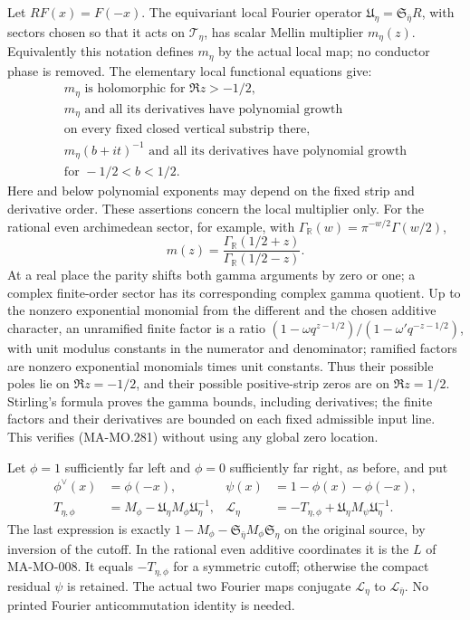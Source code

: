 Let \(R F(x)=F(-x)\). The equivariant local Fourier operator
\(\mathfrak U_\eta=\mathfrak S_{\bar\eta}R\), with sectors
chosen so that it acts on \(\mathcal T_\eta\), has scalar
Mellin multiplier \(m_\eta(z)\). Equivalently this notation
defines \(m_\eta\) by the actual local map; no conductor phase
is removed. The elementary local functional equations give:
\[
 \begin{gathered}
 m_\eta\text{ is holomorphic for }\Re z>-1/2,\\
 m_\eta\text{ and all its derivatives have polynomial growth}\\
 \text{on every fixed closed vertical substrip there},\\
 m_\eta(b+it)^{-1}\text{ and all its derivatives have polynomial growth}\\
 \text{for }-1/2<b<1/2.
 \end{gathered}
 \tag{MA-MO.281}
\]
Here and below polynomial exponents may depend on the fixed
strip and derivative order. These assertions concern the local
multiplier only. For the rational even archimedean sector, for
example, with \(\Gamma_{\mathbb R}(w)=\pi^{-w/2}\Gamma(w/2)\),
\[
       m(z)=\frac{\Gamma_{\mathbb R}(1/2+z)}
                       {\Gamma_{\mathbb R}(1/2-z)}.
 \tag{MA-MO.282}
\]
At a real place the parity shifts both gamma arguments by zero
or one; a complex finite-order sector has its corresponding
complex gamma quotient. Up to the nonzero exponential monomial
from the different and the chosen additive character, an
unramified finite factor is a ratio
\((1-\omega q^{z-1/2})/(1-\omega' q^{-z-1/2})\), with unit
modulus constants in the numerator and denominator; ramified
factors are nonzero exponential monomials times unit constants.
Thus their possible poles lie on \(\Re z=-1/2\), and their
possible positive-strip zeros are on \(\Re z=1/2\).
Stirling's formula proves the gamma bounds, including derivatives;
the finite factors and their derivatives are bounded on each
fixed admissible input line. This verifies (MA-MO.281) without
using any global zero location.

Let \(\phi=1\) sufficiently far left and \(\phi=0\)
sufficiently far right, as before, and put
\[
 \begin{aligned}
 \phi^\vee(x)&=\phi(-x),&
 \psi(x)&=1-\phi(x)-\phi(-x),\\
 T_{\eta,\phi}&=M_\phi-
       \mathfrak U_\eta M_\phi\mathfrak U_\eta^{-1},&
 \mathcal L_\eta&=-T_{\eta,\phi}
        +\mathfrak U_\eta M_\psi\mathfrak U_\eta^{-1}.
 \end{aligned}
 \tag{MA-MO.283}
\]
The last expression is exactly
\(1-M_\phi-\mathfrak S_{\bar\eta}M_\phi\mathfrak S_\eta\)
on the original source, by inversion of the cutoff. In the
rational even additive coordinates it is the \(L\) of
MA-MO-008. It equals \(-T_{\eta,\phi}\) for a symmetric
cutoff; otherwise the compact residual \(\psi\) is retained.
The actual two Fourier maps conjugate \(\mathcal L_\eta\)
to \(\mathcal L_{\bar\eta}\). No printed Fourier
anticommutation identity is needed.

